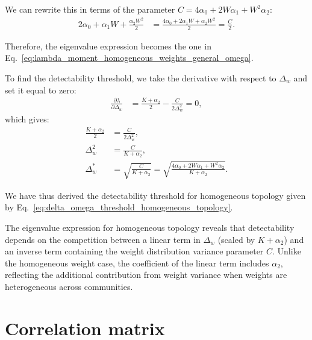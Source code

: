 \documentclass[a4paper,pre,superscriptaddress,floatfix,nofootinbib,twocolumn]{revtex4-1}
\begin{document}
We can rewrite this in terms of the parameter $C = 4\alpha_0 + 2W\alpha_1 + W^2\alpha_2$:
\begin{align*}
2\alpha_0 + \alpha_1 W + \frac{\alpha_2W^2}{2} &= \frac{4\alpha_0 + 2\alpha_1 W + \alpha_2W^2}{2} = \frac{C}{2}.
\end{align*}

Therefore, the eigenvalue expression becomes the one in Eq.~\eqref{eq:lambda_moment_homogeneous_weights_general_omega}.


To find the detectability threshold, we take the derivative with respect to $\Delta_{w}$ and set it equal to zero:
\begin{align*}
\frac{\partial \lambda}{\partial \Delta_{w}} &= \frac{K + \alpha_2}{2} - \frac{C}{2\Delta_{w}^2} = 0,
\end{align*}
which gives:
\begin{align*}
\frac{K + \alpha_2}{2} &= \frac{C}{2\Delta_{w}^2},\\
\Delta_{w}^2 &= \frac{C}{K + \alpha_2},\\
\Delta_{w}^* &= \sqrt{\frac{C}{K + \alpha_2}} = \sqrt{\frac{4\alpha_0 + 2W\alpha_1 + W^2\alpha_2}{K + \alpha_2}}.
\end{align*}

We have thus derived the detectability threshold for homogeneous topology
given by Eq.~\eqref{eq:delta_omega_threshold_homogeneous_topology}.


The eigenvalue expression for homogeneous topology reveals that detectability depends on the competition between a linear term in $\Delta_{w}$ (scaled by $K + \alpha_2$) and an inverse term containing the weight distribution variance parameter $C$. Unlike the homogeneous weight case, the coefficient of the linear term includes $\alpha_2$, reflecting the additional contribution from weight variance when weights are heterogeneous across communities.


\section{Correlation matrix}
\label{sec:correlation_matrix}
\end{document}
